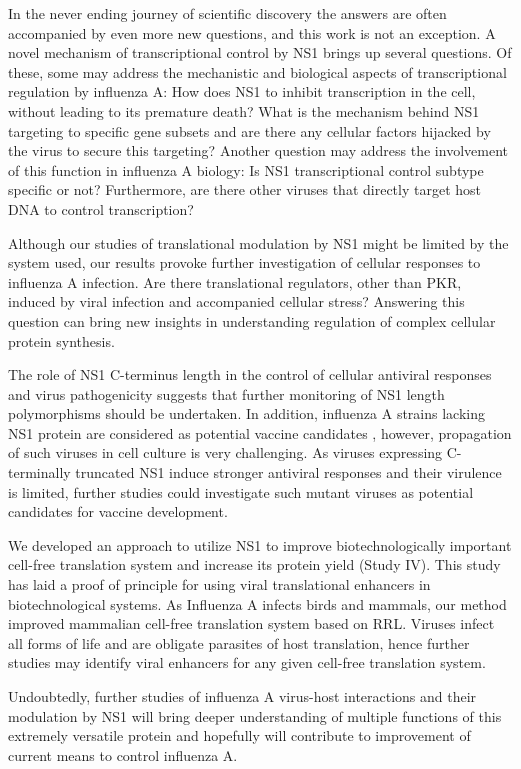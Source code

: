 	In the never ending journey of scientific discovery the answers are often accompanied by even more new questions, and this work is not an exception. A novel mechanism of transcriptional control by NS1 brings up several questions. Of these, some may address the mechanistic and biological aspects of transcriptional regulation by influenza A: How does NS1 to inhibit transcription in the cell, without leading to its premature death? What is the mechanism behind NS1 targeting to specific gene subsets and are there any cellular factors hijacked by the virus to secure this targeting? Another question may address the involvement of this function in influenza A biology: Is NS1 transcriptional control subtype specific or not? Furthermore, are there other viruses that directly target host DNA to control transcription? 
	
	Although our studies of translational modulation by NS1 might be limited by the system used, our results provoke further investigation of cellular responses to influenza A infection. Are there translational regulators, other than PKR, induced by viral infection and accompanied cellular stress? Answering this question can bring new insights in understanding regulation of complex cellular protein synthesis.
	
	The role of NS1 C-terminus length in the control of cellular antiviral responses and virus pathogenicity suggests that further monitoring of NS1 length polymorphisms should be undertaken. In addition, influenza A strains lacking NS1 protein are considered as potential vaccine candidates \parencite{Mossler2013}, however, propagation of such viruses in cell culture is very challenging. As viruses expressing C-terminally truncated NS1 induce stronger antiviral responses and their virulence is limited, further studies could investigate such mutant viruses as potential candidates for vaccine development. 
	
	We developed an approach to utilize NS1 to improve biotechnologically important cell-free translation system and increase its protein yield (Study IV). This study has laid a proof of principle for using viral translational enhancers in biotechnological systems. As Influenza A infects birds and mammals, our method improved mammalian cell-free translation system based on \gls{RRL}. Viruses infect all forms of life and are obligate parasites of host translation, hence further studies may identify viral enhancers for any given cell-free translation system.
	
	Undoubtedly, further studies of influenza A virus-host interactions and their modulation by NS1 will bring deeper understanding of multiple functions of this extremely versatile protein and hopefully will contribute to improvement of current means to control influenza A. 
	